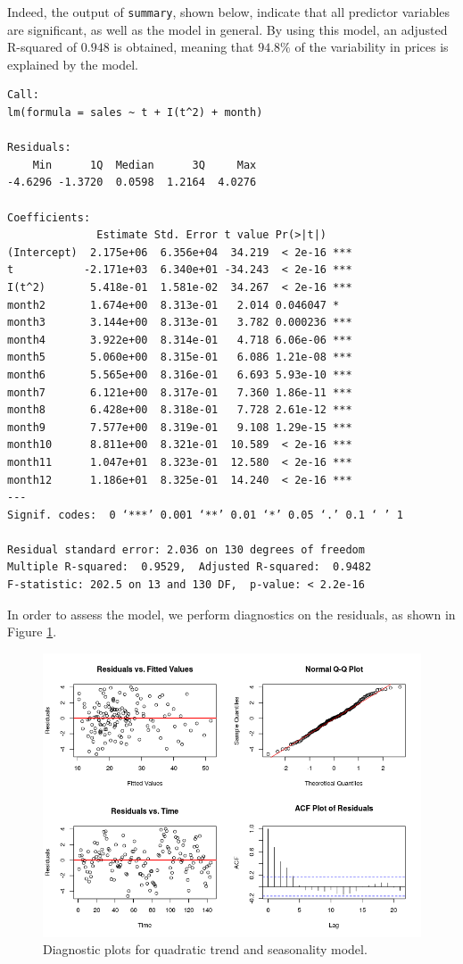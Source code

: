 \documentclass[]{article}
\begin{document}
Indeed, the output of \texttt{summary}, shown below, indicate that all predictor variables are significant, as well as the model in general. By using this model, an adjusted R-squared of $0.948$ is obtained, meaning that $94.8\%$ of the variability in prices is explained by the model.

\begin{verbatim}
Call:
lm(formula = sales ~ t + I(t^2) + month)

Residuals:
    Min      1Q  Median      3Q     Max 
-4.6296 -1.3720  0.0598  1.2164  4.0276 

Coefficients:
              Estimate Std. Error t value Pr(>|t|)    
(Intercept)  2.175e+06  6.356e+04  34.219  < 2e-16 ***
t           -2.171e+03  6.340e+01 -34.243  < 2e-16 ***
I(t^2)       5.418e-01  1.581e-02  34.267  < 2e-16 ***
month2       1.674e+00  8.313e-01   2.014 0.046047 *  
month3       3.144e+00  8.313e-01   3.782 0.000236 ***
month4       3.922e+00  8.314e-01   4.718 6.06e-06 ***
month5       5.060e+00  8.315e-01   6.086 1.21e-08 ***
month6       5.565e+00  8.316e-01   6.693 5.93e-10 ***
month7       6.121e+00  8.317e-01   7.360 1.86e-11 ***
month8       6.428e+00  8.318e-01   7.728 2.61e-12 ***
month9       7.577e+00  8.319e-01   9.108 1.29e-15 ***
month10      8.811e+00  8.321e-01  10.589  < 2e-16 ***
month11      1.047e+01  8.323e-01  12.580  < 2e-16 ***
month12      1.186e+01  8.325e-01  14.240  < 2e-16 ***
---
Signif. codes:  0 ‘***’ 0.001 ‘**’ 0.01 ‘*’ 0.05 ‘.’ 0.1 ‘ ’ 1

Residual standard error: 2.036 on 130 degrees of freedom
Multiple R-squared:  0.9529,  Adjusted R-squared:  0.9482 
F-statistic: 202.5 on 13 and 130 DF,  p-value: < 2.2e-16
\end{verbatim}

In order to assess the model, we perform diagnostics on the residuals, as shown in Figure \ref{diag_seas}. 

\begin{figure}[!ht]
\centering
\includegraphics[width=\textwidth]{diag_seas.png}
\caption{Diagnostic plots for quadratic trend and seasonality model.}
\label{diag_seas}
\end{figure}
\end{document}
